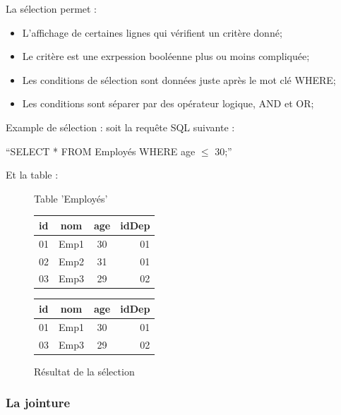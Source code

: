 \documentclass[oneside,13pt,a4paper]{report}
\begin{document}
La sélection permet :
\begin{itemize}
 	\item L'affichage de certaines lignes qui vérifient un critère donné;
	\item Le critère est une exrpession booléenne plus ou moins compliquée;
	\item Les conditions de sélection sont données juste après le mot clé WHERE;
	\item Les conditions sont séparer par des opérateur logique, AND et OR;
\end{itemize}
\pagebreak

Example de sélection :
soit la requête SQL suivante : 

\begin{center}
	\enquote{SELECT * FROM Employés WHERE age $\leq$ 30;}
\end{center}

Et la table : 
\begin{figure}[h]
	\begin{minipage}[c]{.46\linewidth}
		\centering
		\caption{Table 'Employés'}
		\begin{tabular}{|l|c|c|r|}
			\hline
			id   & nom  & age & idDep 
			\\
			\hline
			01 & Emp1 &  30  & 01 \\
			02 & Emp2 &  31  & 01 \\
			03 & Emp3 &  29  & 02 \\
			\hline
		\end{tabular}
	\end{minipage}
	\hfill%
	\begin{minipage}[c]{.46\linewidth}
		\centering
		\caption{Résultat de la sélection}
		\vspace{0.1cm}
		\begin{tabular}{|l|c|c|r|}
			\hline
			id   & nom   & age & idDep
			\\
			\hline
			01 & Emp1 &  30  & 01 \\
			03 & Emp3 &  29  & 02 \\
			\hline
		\end{tabular}
	\end{minipage}
\end{figure}

\subsubsection{La jointure}
\end{document}
